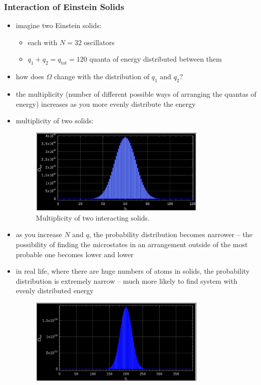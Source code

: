 \documentclass[10pt]{article}
\begin{document}
\subsubsection{Interaction of Einstein Solids}
\begin{itemize}
    \item imagine two Einstein solids:
        \begin{itemize}
            \item each with $N = 32$ oscillators
            \item $q_1 + q_2 = q_{tot} = 120$ quanta of energy distributed between them
        \end{itemize}
    \item how does $\Omega$ change with the distribution of $q_1$ and $q_2$?
    \item the multiplicity (number of different possible ways of arranging the quantas of energy) increases as you more evenly distribute the energy
    \item multiplicity of two solids:
        \begin{figure}[h]
            \centering
            \includegraphics[width=0.8\textwidth]{multiplicityTwoSolids}
            \caption{Multiplicity of two interacting solids.}
            \label{fig:multiplicityTwoSolids}
        \end{figure}
    \item as you increase $N$ and $q$, the probability distribution becomes narrower -- the possibility of finding the microstates in an arrangement outside of the most probable one becomes lower and lower
    \item in real life, where there are huge numbers of atoms in solids, the probability distribution is extremely narrow -- much more likely to find system with evenly distributed energy
        \begin{figure}[h]
            \centering
            \includegraphics[width=0.8\textwidth]{multiplicityMoreNq}

\end{figure}
\end{itemize}
\end{document}
